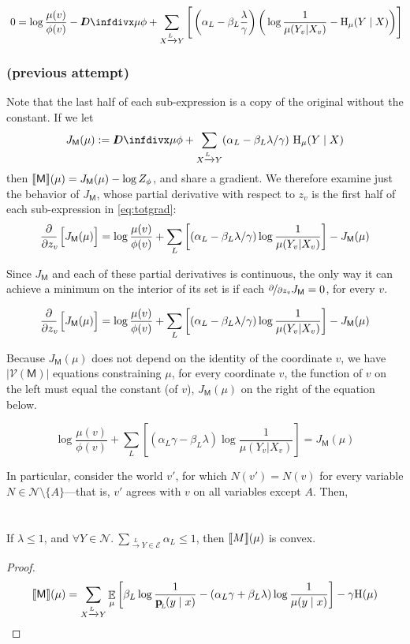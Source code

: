 \documentclass{article}
\newcommand{\bp}[1][L]{\mat{p}_{\!_#1\!}}
\newcommand{\V}{\mathcal V}
\newcommand{\N}{\mathcal N}
\newcommand{\Ed}{\mathcal E}
\newcommand{\sfM}{\mathsf M}
\newcommand{\alle}[1][L]{_{ X \xrightarrow{\!\!#1} Y }}
\begin{document}
	\[\ 0 = \log\frac{\mu(v)}{\phi(v)} - \kldiv{\mu}{\phi} + \sum\alle\Bigg[ \left(\alpha_L  - \beta_L \frac{\lambda}{\gamma} \right) \bigg(\log \frac{1}{\mu(Y_v | X_v)} - \H_\mu(Y \mid X) \bigg) \Bigg]  \]
	
	\subsubsection*{(previous attempt)}

	Note that the last half of each sub-expression is a copy of the original without the constant. If we let
	\[ J_\sfM(\mu) := \kldiv{\mu}{\phi} + \sum\alle (\alpha_L  - \beta_L \lambda / \gamma ) \ \H_\mu(Y \mid X) \]
	then $\bbr{\sfM}(\mu) = J_\sfM(\mu) - \log Z_\phi$, and share a gradient. We therefore examine just the behavior of $J_\sfM$, whose partial derivative with respect to $z_v$ is the first half of each sub-expression in \eqref{eq:totgrad}:
	\[ \pz{J_\sfM(\mu)} = \log\frac{\mu(v)}{\phi(v)} + \sum_L\left[ (\alpha_L  - \beta_L \lambda / \gamma ) \log \frac{1}{\mu(Y_v | X_v)} \right] - J_\sfM(\mu) \] 
	
	
	Since $J_\sfM$ and each of these partial derivatives is continuous, the only way it can achieve a minimum on the interior of its set is if each $\nicefrac{\partial}{\partial z_v} J_\sfM = 0$, for every $v$. 
	
	\[ \pz{J_\sfM(\mu)} = \log\frac{\mu(v)}{\phi(v)} + \sum_L\left[ (\alpha_L  - \beta_L \lambda / \gamma ) \log \frac{1}{\mu(Y_v | X_v)} \right] - J_\sfM(\mu) \] 
	
	
	Because $J_\sfM(\mu)$ does not depend on the identity of the coordinate $v$, we have $|\V(\sfM)|$ equations constraining $\mu$, for every coordinate $v$, the function of $v$ on the left must equal the constant (of $v$), $J_\sfM(\mu)$ on the right of the equation below.
		
	\[  \log\frac{\mu(v)}{\phi(v)} + \sum_L\left[ (\alpha_L \gamma - \beta_L \lambda ) \log \frac{1}{\mu(Y_v | X_v)} \right] = J_\sfM(\mu) \]
	
	In particular, consider the world $v'$, for which $N(v') = N(v)$ for every variable $N \in \N \setminus \{A\}$---that is, $v'$ agrees with $v$ on all variables except $A$. Then,
	
	\section{}
	\begin{prop}
		If $\lambda \leq 1$, and
		$\displaystyle \forall Y \in \N. ~\sum_{ \xrightarrow{\!\!L} Y  \in \Ed } \alpha_L\leq 1$, then
		$\llbracket M\rrbracket(\mu)$ is convex.
	\end{prop}
	\begin{proof}
		\begin{align*}
			\bbr{\sfM}(\mu) &= \sum_{ X \xrightarrow{\!\!L} Y} \E_\mu  \left[
			\beta_L \log \frac{1}{\bp(y\mid x)} - (\alpha_L\gamma + \beta_L \lambda) \log \frac{1}{\mu(y \mid x)} \right] - \gamma \H(\mu) \\
		\end{align*}
		
	\end{proof}
	
	

	
\end{document}
